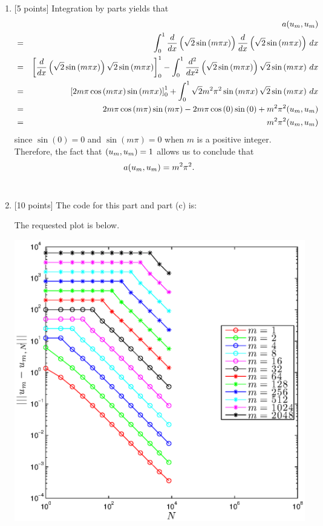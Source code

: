 \begin{solution}
\begin{enumerate}
\item {[5 points]} Integration by parts yields that
\begin{eqnarray*}
&&a(u_m,u_m)
\\
&=&\int_0^1{d \over dx}\left(\sqrt{2}\sin\left(m\pi x\right)\right){d \over dx}\left(\sqrt{2}\sin\left(m\pi x\right)\right)\,dx
\\
&=&\left[{d \over dx}\left(\sqrt{2}\sin\left(m\pi x\right)\right)\sqrt{2}\sin\left(m\pi x\right)\right]_0^1-\int_0^1{d^2 \over dx^2}\left(\sqrt{2}\sin\left(m\pi x\right)\right)\sqrt{2}\sin\left(m\pi x\right)\,dx
\\
&=&\left[2m\pi\cos\left(m\pi x\right)\sin\left(m\pi x\right)\right]_0^1+\int_0^1\sqrt{2}m^2\pi^2\sin\left(m\pi x\right)\sqrt{2}\sin\left(m\pi x\right)\,dx
\\
&=&2m\pi\cos\left(m\pi\right)\sin\left(m\pi\right)-2m\pi\cos\left(0\right)\sin\left(0\right)+m^2\pi^2(u_m,u_m)
\\
&=&m^2\pi^2(u_m,u_m)
\end{eqnarray*}
since $\sin\left(0\right)=0$ and $\sin\left(m\pi\right)=0$ when $m$ is a positive integer. Therefore, the fact that $(u_m,u_m)=1$ allows us to conclude that
\[
a(u_m,u_m)=m^2\pi^2.
\]
\\
\item {[10 points]} The code for this part and part (c) is:



The requested plot is below.

\begin{center}
\includegraphics[scale=0.75]{hw34b.eps}
\end{center}


\end{enumerate}
\end{solution}
